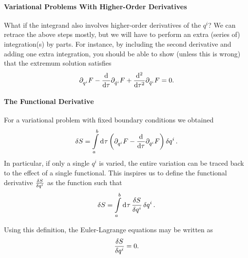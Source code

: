 \paragraph{Variational Problems With Higher-Order Derivatives}
What if the integrand also involves higher-order derivatives of the $q^{i}$? We can retrace the above steps mostly, but we will have to perform an extra (series of) integration(s) by parts. For instance, by including the second derivative and adding one extra integration, you should be able to show (unless this is wrong) that the extremum solution satisfies
\begin{align*}
	\partial^{}_{q^{i}}F - \dv{\tau}\partial^{}_{\dot{q}^{i}}F + \dv[2]{\tau}\partial^{}_{\ddot{q}^{i}}F = 0.
\end{align*}

\paragraph{The Functional Derivative}
For a variational problem with fixed boundary conditions we obtained
\begin{align*}
	\var{S} =  \int\limits_{a}^{b}\dd[]{\tau}\left(\partial^{}_{q^{i}}F - \dv{\tau}\partial^{}_{\dot{q}^{i}}F\right)\var{q^{i}}.
\end{align*}
In particular, if only a single $q^{i}$ is varied, the entire variation can be traced back to the effect of a single functional. This inspires us to define the functional derivative $\fdv{S}{q^{i}}$ as the function such that
\begin{align*}
	\var{S} =  \integ{a}{b}{\tau}{\fdv{S}{q^{i}}\var{q^{i}}}.
\end{align*}

Using this definition, the Euler-Lagrange equations may be written as
\begin{align*}
	\fdv{S}{q^{i}} = 0.
\end{align*}